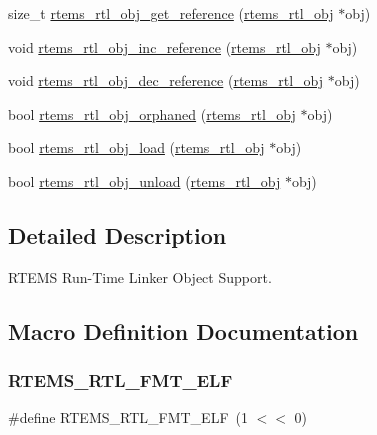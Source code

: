 \begin{DoxyCompactItemize}
\item 
size\+\_\+t \mbox{\hyperlink{rtl-obj_8h_a1e3d355bd13971d7bc629cb890b261bf}{rtems\+\_\+rtl\+\_\+obj\+\_\+get\+\_\+reference}} (\mbox{\hyperlink{structrtems__rtl__obj}{rtems\+\_\+rtl\+\_\+obj}} $\ast$obj)
\item 
void \mbox{\hyperlink{rtl-obj_8h_a86116ffbe87cb58f2428e6c66e4db58e}{rtems\+\_\+rtl\+\_\+obj\+\_\+inc\+\_\+reference}} (\mbox{\hyperlink{structrtems__rtl__obj}{rtems\+\_\+rtl\+\_\+obj}} $\ast$obj)
\item 
void \mbox{\hyperlink{rtl-obj_8h_a77c0042ad0312c5043e9d8259171e6f5}{rtems\+\_\+rtl\+\_\+obj\+\_\+dec\+\_\+reference}} (\mbox{\hyperlink{structrtems__rtl__obj}{rtems\+\_\+rtl\+\_\+obj}} $\ast$obj)
\item 
bool \mbox{\hyperlink{rtl-obj_8h_af86dc76c1597801ece0edbe4d91a0ee8}{rtems\+\_\+rtl\+\_\+obj\+\_\+orphaned}} (\mbox{\hyperlink{structrtems__rtl__obj}{rtems\+\_\+rtl\+\_\+obj}} $\ast$obj)
\item 
bool \mbox{\hyperlink{rtl-obj_8h_a35de063bbe9cf53cc23ee71a3069e641}{rtems\+\_\+rtl\+\_\+obj\+\_\+load}} (\mbox{\hyperlink{structrtems__rtl__obj}{rtems\+\_\+rtl\+\_\+obj}} $\ast$obj)
\item 
bool \mbox{\hyperlink{rtl-obj_8h_a8c0debf8dbf88e9eac3f24357473b1bc}{rtems\+\_\+rtl\+\_\+obj\+\_\+unload}} (\mbox{\hyperlink{structrtems__rtl__obj}{rtems\+\_\+rtl\+\_\+obj}} $\ast$obj)
\end{DoxyCompactItemize}


\subsection{Detailed Description}
R\+T\+E\+MS Run-\/\+Time Linker Object Support. 



\subsection{Macro Definition Documentation}
\mbox{\label{rtl-obj_8h_a6953d174aa285c36ca012a802cb849e5}} 
\subsubsection{\texorpdfstring{RTEMS\_RTL\_FMT\_ELF}{RTEMS\_RTL\_FMT\_ELF}}
{\footnotesize\ttfamily \#define R\+T\+E\+M\+S\+\_\+\+R\+T\+L\+\_\+\+F\+M\+T\+\_\+\+E\+LF~(1 $<$$<$ 0)}

